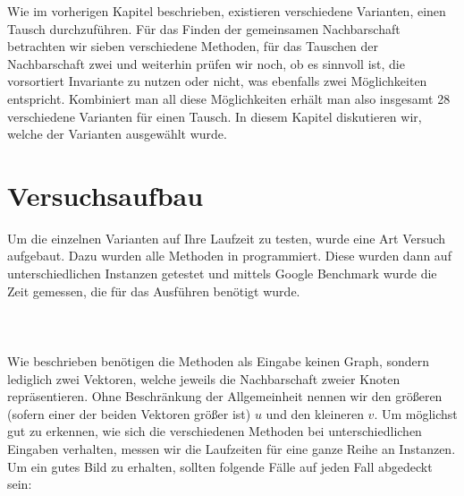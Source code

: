 \label{cap:tests}
Wie im vorherigen Kapitel beschrieben, existieren verschiedene Varianten, einen \gc{} Tausch 
durchzuführen. Für das Finden der gemeinsamen Nachbarschaft betrachten wir sieben verschiedene Methoden, 
für das Tauschen der Nachbarschaft zwei und weiterhin prüfen wir noch, ob es sinnvoll ist, 
die vorsortiert Invariante zu nutzen oder nicht, was ebenfalls zwei Möglichkeiten entspricht.
Kombiniert man all diese Möglichkeiten erhält man also insgesamt 28 verschiedene Varianten für einen \gc{} 
Tausch.
In diesem Kapitel diskutieren wir, welche der Varianten ausgewählt wurde.

\section{Versuchsaufbau}
Um die einzelnen Varianten auf Ihre Laufzeit zu testen, wurde eine Art Versuch aufgebaut.
Dazu wurden alle Methoden in \cpp programmiert. Diese wurden dann auf unterschiedlichen
Instanzen getestet und mittels Google Benchmark \cite{benchmark} wurde die Zeit gemessen, 
die für das Ausführen benötigt wurde.
\\
\\
\\
\\
Wie %
beschrieben benötigen die Methoden als Eingabe keinen Graph, 
sondern lediglich zwei Vektoren, welche jeweils die Nachbarschaft zweier Knoten repräsentieren. Ohne 
Beschränkung der Allgemeinheit nennen wir den größeren (sofern einer der beiden Vektoren größer ist)
$u$ und den kleineren $v$.
Um möglichst gut zu erkennen, wie sich die verschiedenen Methoden bei unterschiedlichen
Eingaben verhalten, messen wir die Laufzeiten für eine ganze Reihe an Instanzen. 
Um ein gutes Bild zu erhalten, sollten folgende Fälle auf jeden Fall abgedeckt sein:

